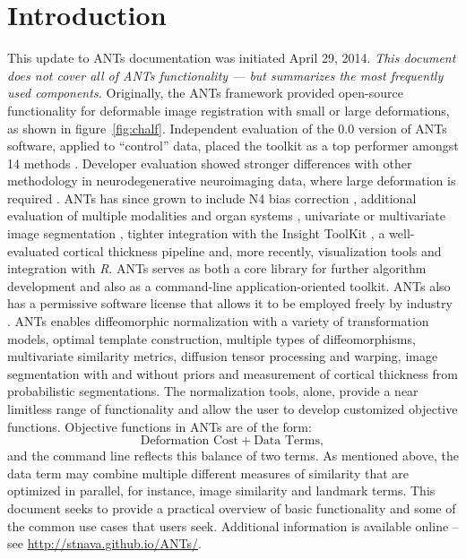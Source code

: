 \documentclass{InsightArticle}
\newcommand{\R}{\textit{R}}
\begin{document}
\section{Introduction}
This update to ANTs documentation was initiated April 29, 2014.
\textit{This document does not cover all of ANTs functionality --- but
  summarizes the most frequently used components.}
Originally, the ANTs framework provided open-source functionality for deformable
image registration with small or large deformations, as shown in
figure~\ref{fig:chalf}.  Independent evaluation of the 0.0 version of ANTs software, applied to ``control'' data, 
placed the toolkit as a top performer amongst 14
methods \cite{Klein2009}.  Developer evaluation showed stronger differences 
with other methodology in neurodegenerative neuroimaging data, 
where large deformation is required \cite{Avants2008b}. 
ANTs has since grown to include N4 bias
correction \cite{Tustison2010}, additional evaluation of multiple
modalities and organ systems \cite{Tustison2014,Tustison2011,Murphy2011}, univariate or multivariate image segmentation
\cite{Avants2011,Tustison2011a}, tighter integration with the Insight ToolKit \cite{Tustison2013,AvantsITK}, a
well-evaluated cortical thickness pipeline \cite{TustisonACT} and, more recently,
visualization tools and integration with \R \cite{ANTsAndArboles}.
ANTs serves as both a core library for further
algorithm development and also as a command-line application-oriented
toolkit.  ANTs also has a permissive software license that allows it
to be employed freely by industry \cite{rosen2004open}.
ANTs enables diffeomorphic normalization with a variety of
transformation models, optimal template construction, multiple types
of diffeomorphisms, multivariate similarity metrics, diffusion tensor
processing and warping, image segmentation with and without priors and
measurement of cortical thickness from probabilistic segmentations.
The normalization tools, alone, provide a near limitless range of
functionality and allow the user to develop customized objective
functions.  Objective functions in ANTs are of the form: $$
\text{Deformation Cost} + \text{Data Terms},$$ and the command
line reflects this balance of two terms.  As mentioned above, the
data term may combine multiple different measures of
similarity that are optimized in parallel, for instance, image similarity 
and landmark terms.  This document seeks to
provide a practical overview of basic functionality and some of the common use cases that
users seek.
Additional information is available online -- see 
\href{http://stnava.github.io/ANTs/}{http://stnava.github.io/ANTs/}.
\end{document}
